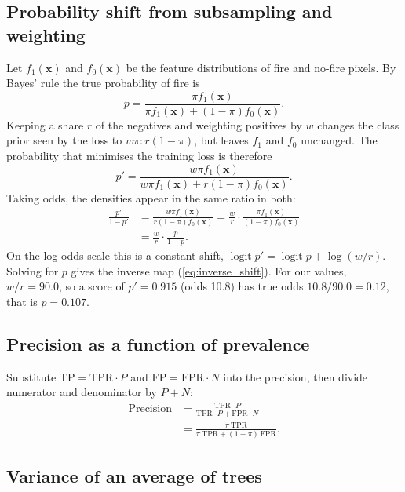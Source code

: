 \subsection{Probability shift from subsampling and weighting}
\label{app:shift}

Let $f_1(\mathbf{x})$ and $f_0(\mathbf{x})$ be the feature distributions of fire and no-fire pixels. By
Bayes' rule the true probability of fire is
\begin{equation}
p = \frac{\pi f_1(\mathbf{x})}{\pi f_1(\mathbf{x}) + (1-\pi) f_0(\mathbf{x})} .
\end{equation}
Keeping a share $r$ of the negatives and weighting positives by $w$ changes the class prior seen by the
loss to $w\pi : r(1-\pi)$, but leaves $f_1$ and $f_0$ unchanged. The probability that minimises the
training loss is therefore
\begin{equation}
p' = \frac{w\pi f_1(\mathbf{x})}{w\pi f_1(\mathbf{x}) + r(1-\pi) f_0(\mathbf{x})} .
\end{equation}
Taking odds, the densities appear in the same ratio in both:
\begin{align}
\frac{p'}{1-p'} &= \frac{w\pi f_1(\mathbf{x})}{r(1-\pi) f_0(\mathbf{x})}
= \frac{w}{r}\cdot\frac{\pi f_1(\mathbf{x})}{(1-\pi) f_0(\mathbf{x})} \nonumber\\
&= \frac{w}{r}\cdot\frac{p}{1-p} .
\end{align}
On the log-odds scale this is a constant shift, $\operatorname{logit} p' = \operatorname{logit} p + \log(w/r)$.
Solving for $p$ gives the inverse map (\ref{eq:inverse_shift}). For our values, $w/r = 90.0$, so a score
of $p' = 0.915$ (odds 10.8) has true odds $10.8/90.0 = 0.12$, that is $p = 0.107$.

\subsection{Precision as a function of prevalence}
\label{app:prec}

Substitute $\mathrm{TP} = \mathrm{TPR}\cdot P$ and $\mathrm{FP} = \mathrm{FPR}\cdot N$ into the precision,
then divide numerator and denominator by $P+N$:
\begin{align}
\mathrm{Precision} &= \frac{\mathrm{TPR}\cdot P}{\mathrm{TPR}\cdot P + \mathrm{FPR}\cdot N} \nonumber\\
&= \frac{\pi\,\mathrm{TPR}}{\pi\,\mathrm{TPR} + (1-\pi)\,\mathrm{FPR}} .
\end{align}

\subsection{Variance of an average of trees}
\label{app:var}


